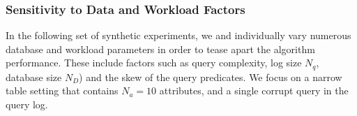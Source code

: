 \subsubsection{Sensitivity to Data and Workload Factors}

In the following set of synthetic experiments, we  and
individually vary numerous database and workload parameters in order to tease apart the algorithm performance.  
These include factors such as query complexity, log size $N_q$, database size $N_D$) and the skew of the query predicates.
We focus on a narrow table setting that contains $N_a = 10$ attributes, and a single corrupt query in the query log.
